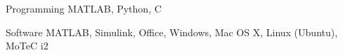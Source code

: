 
\begin{cvskills}
  \cvskill%
    {Programming}
    {MATLAB, Python, C}

  \cvskill%
    {Software}
    {MATLAB, Simulink, Office, Windows, Mac OS X, Linux (Ubuntu), MoTeC i2}
\end{cvskills}
